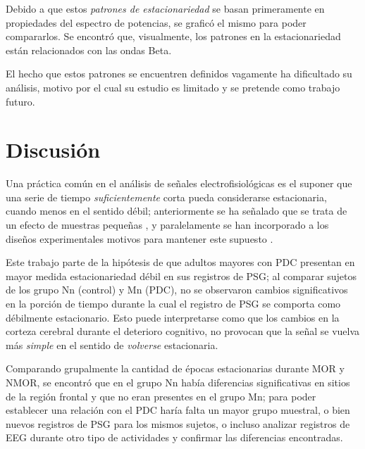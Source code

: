 Debido a que estos \textit{patrones de estacionariedad} se basan primeramente en propiedades del
espectro de potencias, se graficó el mismo para poder compararlos. Se encontró que, visualmente,
los patrones en la estacionariedad están relacionados con las ondas Beta.

El hecho que estos patrones se encuentren definidos vagamente ha dificultado su análisis, motivo
por el cual su estudio es limitado y se pretende como trabajo futuro.


\section{Discusión}

Una práctica común en el análisis de señales electrofisiológicas es el suponer que una serie de 
tiempo \textit{suficientemente} corta pueda considerarse estacionaria, cuando menos en el sentido
débil; anteriormente se ha señalado que se trata de un efecto de muestras pequeñas \cite{Melard89},
y paralelamente se han incorporado a los diseños experimentales motivos para mantener este supuesto
\cite{Kaiser00}.

Este trabajo parte de la hipótesis de que adultos mayores con PDC presentan en mayor medida 
estacionariedad débil en sus registros de PSG; al comparar sujetos de los grupo Nn (control) y Mn 
(PDC), no se observaron cambios significativos en la porción de tiempo durante la cual el registro 
de PSG se comporta como débilmente estacionario. 
Esto puede interpretarse como que los cambios en la corteza cerebral durante el deterioro 
cognitivo, no provocan que  la señal se vuelva más \textit{simple} en el sentido de 
\textit{volverse} estacionaria.

Comparando grupalmente la cantidad de épocas estacionarias durante MOR y NMOR, se encontró que en 
el grupo Nn había diferencias significativas en sitios de la región frontal y que no eran presentes
en el grupo Mn; para poder establecer una relación con el PDC haría falta un mayor grupo muestral, 
o bien nuevos registros de PSG para los mismos sujetos, o incluso analizar registros de EEG durante 
otro tipo de actividades y confirmar las diferencias encontradas.

